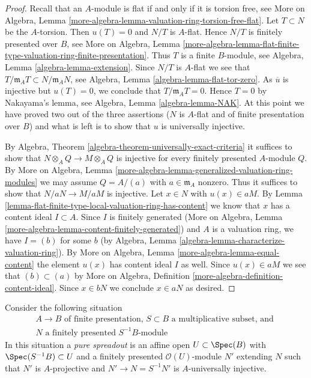 \begin{proof}
Recall that an $A$-module is flat if and only if it is torsion free, see
More on Algebra, Lemma
\ref{more-algebra-lemma-valuation-ring-torsion-free-flat}.
Let $T \subset N$ be the $A$-torsion. Then $u(T) = 0$ and
$N/T$ is $A$-flat. Hence $N/T$ is finitely presented over $B$, see
More on Algebra, Lemma
\ref{more-algebra-lemma-flat-finite-type-valuation-ring-finite-presentation}.
Thus $T$ is a finite $B$-module, see
Algebra, Lemma \ref{algebra-lemma-extension}.
Since $N/T$ is $A$-flat we see that
$T/\mathfrak m_A T \subset N/\mathfrak m_A N$, see
Algebra, Lemma \ref{algebra-lemma-flat-tor-zero}.
As $\overline{u}$ is injective but $u(T) = 0$, we conclude that
$T/\mathfrak m_A T = 0$. Hence $T = 0$ by Nakayama's lemma, see
Algebra, Lemma \ref{algebra-lemma-NAK}. At this point we have
proved two out of the three assertions ($N$ is $A$-flat and
of finite presentation over $B$) and what is left is to show that
$u$ is universally injective.

\medskip\noindent
By Algebra, Theorem \ref{algebra-theorem-universally-exact-criteria}
it suffices to show that $N \otimes_A Q \to M \otimes_A Q$ is injective
for every finitely presented $A$-module $Q$. By
More on Algebra, Lemma
\ref{more-algebra-lemma-generalized-valuation-ring-modules}
we may assume $Q = A/(a)$ with $a \in \mathfrak m_A$ nonzero.
Thus it suffices to show that $N/aN \to M/aM$ is injective.
Let $x \in N$ with $u(x) \in aM$. By
Lemma \ref{lemma-flat-finite-type-local-valuation-ring-has-content}
we know that $x$ has a content ideal $I \subset A$. Since
$I$ is finitely generated
(More on Algebra, Lemma \ref{more-algebra-lemma-content-finitely-generated})
and $A$ is a valuation ring, we have $I = (b)$ for some $b$
(by Algebra, Lemma \ref{algebra-lemma-characterize-valuation-ring}).
By More on Algebra, Lemma \ref{more-algebra-lemma-equal-content}
the element $u(x)$ has content ideal $I$ as well.
Since $u(x) \in aM$ we see that $(b) \subset (a)$
by More on Algebra, Definition \ref{more-algebra-definition-content-ideal}.
Since $x \in bN$ we conclude $x \in aN$ as desired.
\end{proof}

\noindent
Consider the following situation
\begin{equation}
\label{equation-star}
\begin{matrix}
A \to B\text{ of finite presentation, }S \subset B
\text{ a multiplicative subset, and }\\
N\text{ a finitely presented }S^{-1}B\text{-module}
\end{matrix}
\end{equation}
In this situation a {\it pure spreadout} is an affine open
$U \subset \Spec(B)$ with $\Spec(S^{-1}B) \subset U$ and a
finitely presented $\mathcal{O}(U)$-module $N'$ extending $N$
such that $N'$ is $A$-projective and $N' \to N = S^{-1}N'$
is $A$-universally injective.

